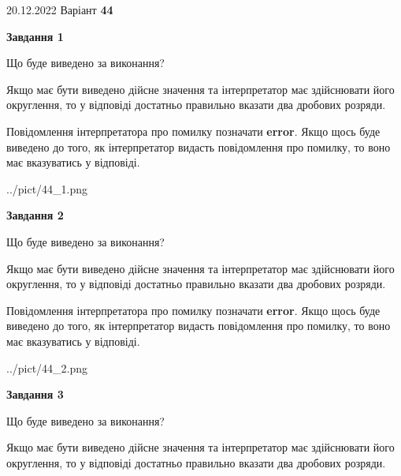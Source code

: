 \documentclass[12pt, ukrainian]{article}
\begin{document}
{20.12.2022 Варіант \No \textbf { 44 }\par}
{
\begin {Large}

{\begin {center}\textbf{Завдання 1}\end {center}}\par
Що буде виведено за виконання? \par

Якщо має бути виведено дійсне значення та інтерпретатор має здійснювати його округлення, 
то у відповіді достатньо правильно вказати два дробових розряди.

Повідомлення інтерпретатора про помилку позначати \textbf{error}.
Якщо щось буде виведено до того, як інтерпретатор видасть повідомлення про помилку, 
то воно має вказуватись у відповіді. \par

\begin{center}
	{../pict/44_1.png}
\end{center}
\newpage

{\begin {center}\textbf{Завдання 2}\end {center}}\par
Що буде виведено за виконання? \par

Якщо має бути виведено дійсне значення та інтерпретатор має здійснювати його округлення, 
то у відповіді достатньо правильно вказати два дробових розряди.

Повідомлення інтерпретатора про помилку позначати \textbf{error}.
Якщо щось буде виведено до того, як інтерпретатор видасть повідомлення про помилку, 
то воно має вказуватись у відповіді. \par

\begin{center}
	{../pict/44_2.png}
\end{center}
\newpage

{\begin {center}\textbf{Завдання 3}\end {center}}\par
Що буде виведено за виконання? \par

Якщо має бути виведено дійсне значення та інтерпретатор має здійснювати його округлення, 
то у відповіді достатньо правильно вказати два дробових розряди.


\end{Large}}
\end{document}
